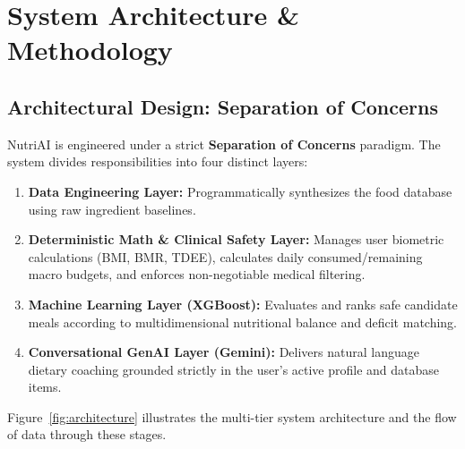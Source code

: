 \documentclass[12pt,a4paper]{report}
\begin{document}
\chapter{System Architecture \& Methodology}

\section{Architectural Design: Separation of Concerns}

NutriAI is engineered under a strict \textbf{Separation of Concerns} paradigm. The system divides responsibilities into four distinct layers:

\begin{enumerate}[leftmargin=*]
  \item \textbf{Data Engineering Layer:} Programmatically synthesizes the food database using raw ingredient baselines.
  \item \textbf{Deterministic Math \& Clinical Safety Layer:} Manages user biometric calculations (BMI, BMR, TDEE), calculates daily consumed/remaining macro budgets, and enforces non-negotiable medical filtering.
  \item \textbf{Machine Learning Layer (XGBoost):} Evaluates and ranks safe candidate meals according to multidimensional nutritional balance and deficit matching.
  \item \textbf{Conversational GenAI Layer (Gemini):} Delivers natural language dietary coaching grounded strictly in the user's active profile and database items.
\end{enumerate}

Figure~\ref{fig:architecture} illustrates the multi-tier system architecture and the flow of data through these stages.
\end{document}
